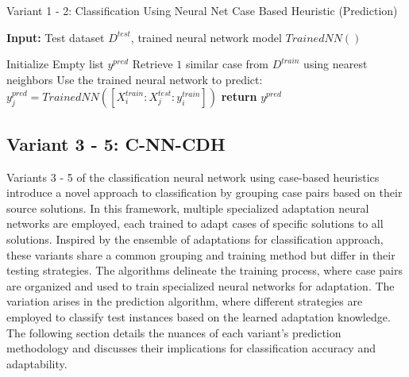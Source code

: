 \documentclass[a4paper, 12pt]{report}
\begin{document}
\begin{algorithm}
    \caption{Variant 1 - 2: Classification Using Neural Net Case Based Heuristic (Prediction)}
    \label{alg:Classification_Varient1_2_using_CBH_predict_alg8}
    \textbf{Input:} Test dataset $D^{test}$, trained neural network model $Trained NN()$
    \begin{algorithmic}[1]
        \State Initialize Empty list $y^{pred}$
            \State Retrieve $1$ similar case from $D^{train}$ using nearest neighbors
                \State Use the trained neural network to predict: $y^{pred}_j = TrainedNN([X^{train}_i:X^{test}_j:y^{train}_i])$
            \EndFor
        \EndFor
        \State \textbf{return} $y^{pred}$
    \end{algorithmic}
\end{algorithm}

\subsection{Variant 3 - 5: C-NN-CDH}
Variants 3 - 5 of the classification neural network using case-based heuristics introduce a novel approach to classification by grouping case pairs based on their source solutions. 
In this framework, multiple specialized adaptation neural networks are employed, each trained to adapt cases of specific solutions to all solutions. 
Inspired by the ensemble of adaptations for classification approach, these variants share a common grouping and training method but differ in their testing strategies. 
The algorithms delineate the training process, where case pairs are organized and used to train specialized neural networks for adaptation. 
The variation arises in the prediction algorithm, where different strategies are employed to classify test instances based on the learned adaptation knowledge. 
The following section details the nuances of each variant's prediction methodology and discusses their implications for classification accuracy and adaptability.
\end{document}
